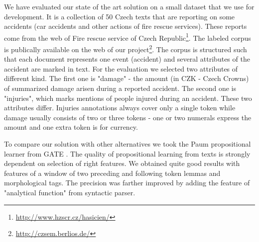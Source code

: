 \documentclass[runningheads,a4paper]{llncs}
\begin{document}
We have evaluated our state of the art solution on a small dataset that we use for development. It is a collection of 50 Czech texts that are reporting on some accidents (car accidents and other actions of fire rescue services). These reports come from the web of Fire rescue service of Czech Republic\footnote{\url{http://www.hzscr.cz/hasicien/}}. The labeled corpus is publically available on the web of our project\footnote{\url{http://czsem.berlios.de/}}.
The corpus is structured such that each document represents one event (accident) and several attributes of the accident are marked in text. For the evaluation we selected two attributes of different kind. The first one is "damage" - the amount (in CZK - Czech Crowns) of summarized damage arisen during a reported accident. The second one is "injuries", which marks mentions of people injured during an accident. These two attributes differ. Injuries annotations always cover only a single token while damage usually consists of two or three tokens - one or two numerals express the amount and one extra token is for currency.


To compare our solution with other alternatives we took the Paum propositional learner from GATE \cite{Li:Paum}. The quality of propositional learning from texts is strongly dependent on selection of right features. We obtained quite good results with features of a window of two preceding and following token lemmas and morphological tags. The precision was farther improved by adding the feature of "analytical function" from syntactic parser.
\end{document}
